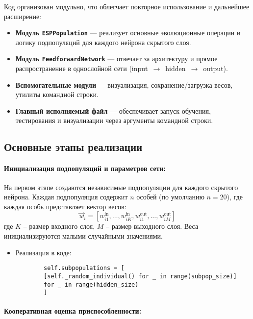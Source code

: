 \documentclass[a4paper,12pt]{article}
\begin{document}
Код организован модульно, что облегчает повторное использование и дальнейшее расширение:
\begin{itemize}
	\item \textbf{Модуль \texttt{ESPPopulation}} — реализует основные эволюционные операции и логику подпопуляций для каждого нейрона скрытого слоя.
	\item \textbf{Модуль \texttt{FeedforwardNetwork}} — отвечает за архитектуру и прямое распространение в однослойной сети (input~$\rightarrow$~hidden~$\rightarrow$~output).
	\item \textbf{Вспомогательные модули} — визуализация, сохранение/загрузка весов, утилиты командной строки.
	\item \textbf{Главный исполняемый файл} — обеспечивает запуск обучения, тестирования и визуализации через аргументы командной строки.
\end{itemize}

\subsection{Основные этапы реализации}

\paragraph{Инициализация подпопуляций и параметров сети:}

На первом этапе создаются независимые подпопуляции для каждого скрытого нейрона. Каждая подпопуляция содержит $n$ особей (по умолчанию $n=20$), где каждая особь представляет вектор весов:
\[
\vec{w}_i = [w_{i1}^{\text{in}}, \dots, w_{iK}^{\text{in}}, w_{i1}^{\text{out}}, \dots, w_{iM}^{\text{out}}]
\]
где $K$ – размер входного слоя, $M$ – размер выходного слоя. Веса инициализируются малыми случайными значениями.

\begin{itemize}
	\item[] Реализация в коде:
	\begin{lstlisting}
		self.subpopulations = [
		[self._random_individual() for _ in range(subpop_size)]
		for _ in range(hidden_size)
		]
	\end{lstlisting}
\end{itemize}

\paragraph{Кооперативная оценка приспособленности:}
\end{document}
